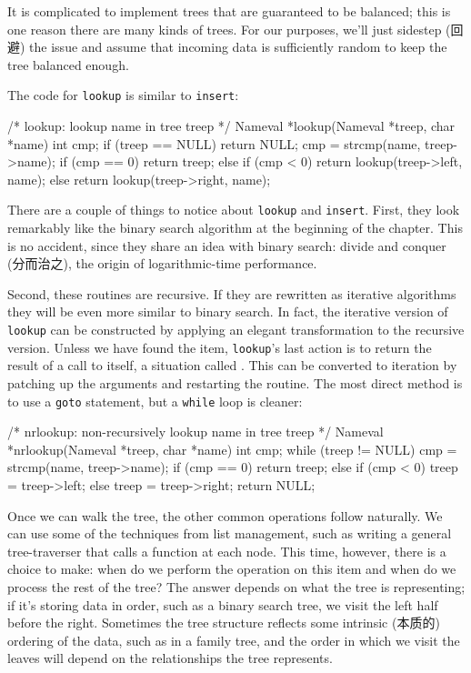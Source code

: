It is complicated to implement trees that are guaranteed to be balanced;
this is one reason there are many kinds of trees. For our purposes, we'll
just sidestep (回避) the issue and assume that incoming data is
sufficiently random to keep the tree balanced enough.

The code for \verb'lookup' is similar to \verb'insert':
\begin{wellcode}
    /* lookup: lookup name in tree treep */
    Nameval *lookup(Nameval *treep, char *name)
    {
        int cmp;
        if (treep == NULL)
            return NULL;
        cmp = strcmp(name, treep->name);
        if (cmp == 0)
            return treep;
        else if (cmp < 0)
            return lookup(treep->left, name);
        else
            return lookup(treep->right, name);
    }
\end{wellcode}

There are a couple of things to notice about \verb'lookup' and
\verb'insert'. First, they look remarkably like the binary search algorithm
at the beginning of the chapter. This is no accident, since they share an
idea with binary search: divide and conquer (分而治之), the origin of
logarithmic-time performance.

Second, these routines are recursive. If they are rewritten as iterative
algorithms they will be even more similar to binary search. In fact, the
iterative version of \verb'lookup' can be constructed by applying an
elegant transformation to the recursive version. Unless we have found the
item, \verb'lookup''s last action is to return the result of a call to
itself, a situation called . This can be converted to
iteration by patching up the arguments and restarting the routine. The most
direct method is to use a \verb'goto' statement, but a \verb'while' loop is
cleaner:
\begin{wellcode}
    /* nrlookup: non-recursively lookup name in tree treep */
    Nameval *nrlookup(Nameval *treep, char *name)
    {
        int cmp;
        while (treep != NULL) {
            cmp = strcmp(name, treep->name);
            if (cmp == 0)
                return treep;
            else if (cmp < 0)
                treep = treep->left;
            else
                treep = treep->right;
        }
        return NULL;
    }
\end{wellcode}

Once we can walk the tree, the other common operations follow naturally. We
can use some of the techniques from list management, such as writing a
general tree-traverser that calls a function at each node. This time,
however, there is a choice to make: when do we perform the operation on
this item and when do we process the rest of the tree? The answer depends
on what the tree is representing; if it's storing data in order, such as a
binary search tree, we visit the left half before the right. Sometimes the
tree structure reflects some intrinsic (本质的) ordering of the data, such
as in a family tree, and the order in which we visit the leaves will depend
on the relationships the tree represents.

